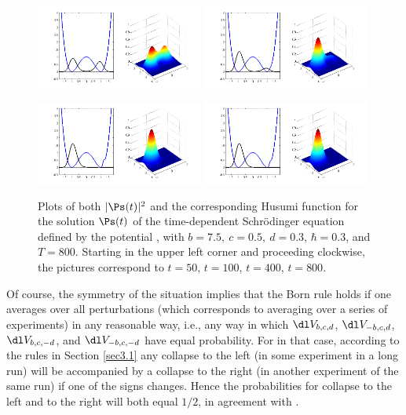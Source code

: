 \documentclass[12pt]{article}
\begin{document}
 \begin{figure}[H]
\begin{center}
\includegraphics[width=0.49\textwidth]{50.png}
\includegraphics[width=0.49\textwidth]{100.png}
\bigskip

\includegraphics[width=0.49\textwidth]{800.png}
\includegraphics[width=0.49\textwidth]{400.png}
\caption{Plots of both $|\Ps(t)|^2$ and the corresponding Husumi function for the solution $\Ps(t)$ of the  time-dependent Schr\"{o}dinger equation defined by the potential , with $b=7.5,\ c=0.5,\ d=0.3$, $\hbar=0.3$, and $T=800$. Starting in the upper left corner and proceeding clockwise, the pictures correspond to $t=50$, $t=100$, $t=400$, $t=800$. }
\end{center}
\end{figure}
\vspace{-5mm}
Of course, the symmetry of the situation implies that the Born rule holds if one averages over all perturbations (which corresponds to averaging over a series of experiments) in any reasonable way, i.e.,
any way  in which $\dl V_{b,c,d}$, $\dl V_{-b,c,d}$, $\dl V_{b,c,-d}$, and $\dl V_{-b,c,-d}$ have equal probability. For in that case, according to the rules in Section \ref{sec3.1} any collapse to the left (in some experiment in a long run) will be accompanied by a collapse to the right (in another experiment of the same run) if one of the signs changes. Hence the probabilities for collapse to the left and to the right will both equal $1/2$, in agreement with .
\newpage 
\end{document}
